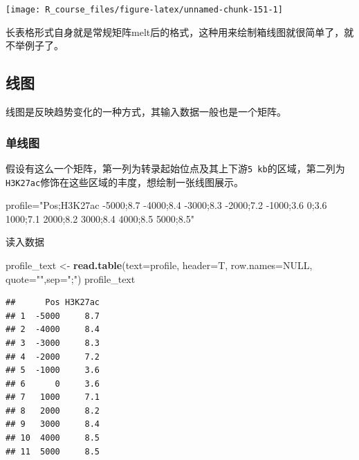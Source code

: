 \documentclass[]{article}
\newenvironment{Shaded}{\begin{snugshade}}{\end{snugshade}}
\newcommand{\KeywordTok}[1]{\textcolor[rgb]{0.13,0.29,0.53}{\textbf{{#1}}}}
\newcommand{\DataTypeTok}[1]{\textcolor[rgb]{0.13,0.29,0.53}{{#1}}}
\newcommand{\StringTok}[1]{\textcolor[rgb]{0.31,0.60,0.02}{{#1}}}
\newcommand{\OtherTok}[1]{\textcolor[rgb]{0.56,0.35,0.01}{{#1}}}
\newcommand{\NormalTok}[1]{{#1}}
\numberwithin{figure}{section}
\numberwithin{table}{section}
\theoremstyle{definition}
\theoremstyle{definition}
\theoremstyle{definition}
\theoremstyle{remark}
\begin{document}
\begin{center}\texttt{[image: R\_course\_files/figure-latex/unnamed-chunk-151-1]} \end{center}

长表格形式自身就是常规矩阵melt后的格式，这种用来绘制箱线图就很简单了，就不举例子了。

\subsection{线图}

线图是反映趋势变化的一种方式，其输入数据一般也是一个矩阵。

\subsubsection{单线图}

假设有这么一个矩阵，第一列为转录起始位点及其上下游\texttt{5\ kb}的区域，第二列为\texttt{H3K27ac}修饰在这些区域的丰度，想绘制一张线图展示。

\begin{Shaded}
\begin{Highlighting}[]
\NormalTok{profile=}\StringTok{"Pos;H3K27ac}
\StringTok{-5000;8.7}
\StringTok{-4000;8.4}
\StringTok{-3000;8.3}
\StringTok{-2000;7.2}
\StringTok{-1000;3.6}
\StringTok{0;3.6}
\StringTok{1000;7.1}
\StringTok{2000;8.2}
\StringTok{3000;8.4}
\StringTok{4000;8.5}
\StringTok{5000;8.5"}
\end{Highlighting}
\end{Shaded}

读入数据

\begin{Shaded}
\begin{Highlighting}[]
\NormalTok{profile_text <-}\StringTok{ }\KeywordTok{read.table}\NormalTok{(}\DataTypeTok{text=}\NormalTok{profile, }\DataTypeTok{header=}\NormalTok{T, }\DataTypeTok{row.names=}\OtherTok{NULL}\NormalTok{, }\DataTypeTok{quote=}\StringTok{""}\NormalTok{,}\DataTypeTok{sep=}\StringTok{";"}\NormalTok{)}
\NormalTok{profile_text}
\end{Highlighting}
\end{Shaded}

\begin{verbatim}
##      Pos H3K27ac
## 1  -5000     8.7
## 2  -4000     8.4
## 3  -3000     8.3
## 4  -2000     7.2
## 5  -1000     3.6
## 6      0     3.6
## 7   1000     7.1
## 8   2000     8.2
## 9   3000     8.4
## 10  4000     8.5
## 11  5000     8.5
\end{verbatim}
\end{document}
